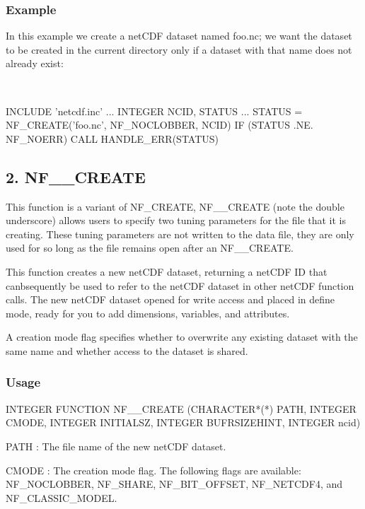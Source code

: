 \subsubsection*{Example}

In this example we create a net\+C\+DF dataset named foo.\+nc; we want the dataset to be created in the current directory only if a dataset with that name does not already exist\+:

 


\begin{DoxyCode}
INCLUDE 'netcdf.inc'
  ...
INTEGER NCID, STATUS
...
STATUS = NF\_CREATE('foo.nc', NF\_NOCLOBBER, NCID)
IF (STATUS .NE. NF\_NOERR) CALL HANDLE\_ERR(STATUS)
\end{DoxyCode}
\hypertarget{nc_f77_interface_guide_f77_F__CREATE}{}\subsection{2. N\+F\+\_\+\+\_\+\+C\+R\+E\+A\+T\+E }\label{nc_f77_interface_guide_f77_F__CREATE}
This function is a variant of N\+F\+\_\+\+C\+R\+E\+A\+TE, N\+F\+\_\+\+\_\+\+C\+R\+E\+A\+TE (note the double underscore) allows users to specify two tuning parameters for the file that it is creating. These tuning parameters are not written to the data file, they are only used for so long as the file remains open after an N\+F\+\_\+\+\_\+\+C\+R\+E\+A\+TE.

This function creates a new net\+C\+DF dataset, returning a net\+C\+DF ID that canbsequently be used to refer to the net\+C\+DF dataset in other net\+C\+DF function calls. The new net\+C\+DF dataset opened for write access and placed in define mode, ready for you to add dimensions, variables, and attributes.

A creation mode flag specifies whether to overwrite any existing dataset with the same name and whether access to the dataset is shared.

\subsubsection*{Usage}


\begin{DoxyCode}
INTEGER FUNCTION NF\_\_CREATE (CHARACTER*(*) PATH, INTEGER CMODE, INTEGER INITIALSZ,
                            INTEGER BUFRSIZEHINT, INTEGER ncid)
\end{DoxyCode}
 {\ttfamily P\+A\+TH} \+: The file name of the new net\+C\+DF dataset.

{\ttfamily C\+M\+O\+DE} \+: The creation mode flag. The following flags are available\+: N\+F\+\_\+\+N\+O\+C\+L\+O\+B\+B\+ER, N\+F\+\_\+\+S\+H\+A\+RE, N\+F\+\_\+B\+I\+T\+\_\+\+O\+F\+F\+S\+ET, N\+F\+\_\+\+N\+E\+T\+C\+D\+F4, and N\+F\+\_\+\+C\+L\+A\+S\+S\+I\+C\+\_\+\+M\+O\+D\+EL.

